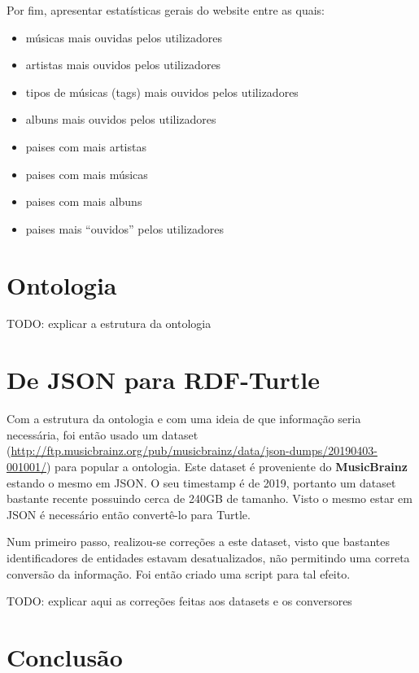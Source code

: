 \documentclass{article}
\begin{document}
Por fim, apresentar estatísticas gerais do website entre as quais:
\begin{itemize}
    \item músicas mais ouvidas pelos utilizadores
    \item artistas mais ouvidos pelos utilizadores
    \item tipos de músicas (tags) mais ouvidos pelos utilizadores
    \item albuns mais ouvidos pelos utilizadores
    \item paises com mais artistas
    \item paises com mais músicas
    \item paises com mais albuns
    \item paises mais ``ouvidos'' pelos utilizadores
\end{itemize}

\section{Ontologia}

TODO: explicar a estrutura da ontologia

\section{De JSON para RDF-Turtle}

Com a estrutura da ontologia e com uma ideia de que informação seria necessária, foi então usado um dataset (\url{http://ftp.musicbrainz.org/pub/musicbrainz/data/json-dumps/20190403-001001/}) para popular a ontologia. Este dataset é proveniente do \textbf{MusicBrainz} estando o mesmo em JSON. O seu timestamp é de 2019, portanto um dataset bastante recente possuindo cerca de 240GB de tamanho. Visto o mesmo estar em JSON é necessário então convertê-lo para Turtle.

Num primeiro passo, realizou-se correções a este dataset, visto que bastantes identificadores de entidades estavam desatualizados, não permitindo uma correta conversão da informação. Foi então criado uma script para tal efeito.

TODO: explicar aqui as correções feitas aos datasets e os conversores

\section{Conclusão}

\newpage 
\printbibliography

\begin{appendices}

\end{appendices}
\end{document}
